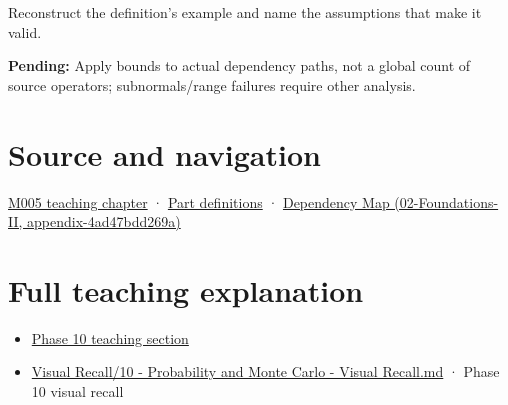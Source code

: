 Reconstruct the definition's example and name the assumptions that make it valid.

\textbf{Pending:} Apply bounds to actual dependency paths, not a global count of source operators; subnormals/range failures require other analysis.

\section{Source and navigation}\label{appendix-f82e270791c8-source-and-navigation}

\href{Continuous\%20Notes/Computing\%20Foundations\%20-\%20From\%20Bits\%20to\%20C++\%20and\%20Systems\%20APIs\#When\%20arithmetic\%20meets\%20uncertainty}{M005 teaching chapter} · \hyperref[appendix-fd090d982a15-m005---parts-77-88]{Part definitions} · \href{../02-Foundations-II/main.pdf\#nameddest=appendix-4ad47bdd269a}{Dependency Map (02-Foundations-II, appendix-4ad47bdd269a)}

\section{Full teaching explanation}\label{appendix-f82e270791c8-full-teaching-explanation}

\begin{itemize}
\tightlist
\item
  \href{Continuous\%20Notes/Computing\%20Foundations\%20-\%20From\%20Bits\%20to\%20C++\%20and\%20Systems\%20APIs\#9.\%20Finite\%20samples\%20need\%20stable\%20descriptive\%20statistics}{Phase 10 teaching section}
\item
  \hyperref[appendix-cb5af353ef77]{Visual Recall/10 - Probability and Monte Carlo - Visual Recall.md} · Phase 10 visual recall
\end{itemize}
